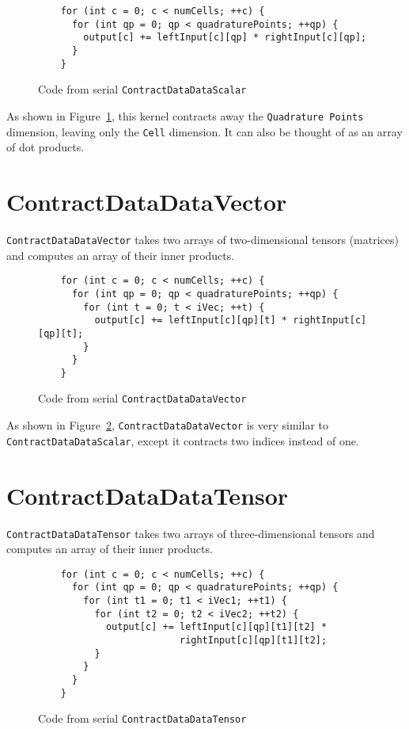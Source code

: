 \begin{figure}[ht]
    \begin{lstlisting}
    for (int c = 0; c < numCells; ++c) {
      for (int qp = 0; qp < quadraturePoints; ++qp) {
        output[c] += leftInput[c][qp] * rightInput[c][qp];
      }
    }
    \end{lstlisting}
\caption{Code from serial \texttt{ContractDataDataScalar}
\label{lst:ContractDataDataScalarSerial}} 
\end{figure}

As shown in 
Figure~\ref{lst:ContractDataDataScalarSerial}, this kernel contracts away the
\texttt{Quadrature Points} dimension, leaving only the \texttt{Cell} dimension.
It can also be thought of as an array of dot products.

\section{ContractDataDataVector}
\texttt{ContractDataDataVector} takes two arrays of two-dimensional tensors
(matrices) and computes an array of their inner products.
\begin{figure}[ht]
    \begin{lstlisting}
    for (int c = 0; c < numCells; ++c) {
      for (int qp = 0; qp < quadraturePoints; ++qp) {
        for (int t = 0; t < iVec; ++t) {
          output[c] += leftInput[c][qp][t] * rightInput[c][qp][t];
        }
      }
    }
    \end{lstlisting}
\caption{Code from serial \texttt{ContractDataDataVector}
\label{lst:ContractDataDataVectorSerial}} 
\end{figure}

As shown in Figure~\ref{lst:ContractDataDataVectorSerial},
\texttt{ContractDataDataVector} is very similar to
\texttt{ContractDataDataScalar}, except it contracts two indices instead of
one.

\section{ContractDataDataTensor}\label{section:ContractDataDataTensor}
\texttt{ContractDataDataTensor} takes two arrays of three-dimensional tensors
and computes an array of their inner products.

\begin{figure}[ht]
    \begin{lstlisting}
    for (int c = 0; c < numCells; ++c) {
      for (int qp = 0; qp < quadraturePoints; ++qp) {
        for (int t1 = 0; t1 < iVec1; ++t1) {
          for (int t2 = 0; t2 < iVec2; ++t2) {
            output[c] += leftInput[c][qp][t1][t2] * 
                         rightInput[c][qp][t1][t2];
          }
        }
      }
    }
    \end{lstlisting}
\caption{Code from serial \texttt{ContractDataDataTensor}
\label{lst:ContractDataDataTensorSerial}} 
\end{figure}

